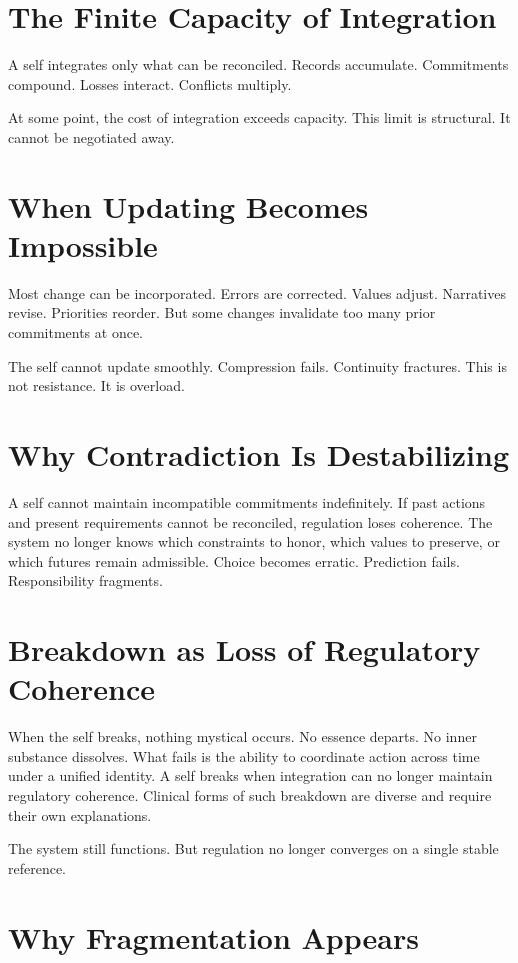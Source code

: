 \documentclass[11pt,twoside,openright]{book}
\begin{document}
\section*{The Finite Capacity of Integration}

A self integrates only what can be reconciled. Records accumulate. Commitments compound. Losses interact. Conflicts multiply.

At some point, the cost of integration exceeds capacity. This limit is structural. It cannot be negotiated away.

\section*{When Updating Becomes Impossible}

Most change can be incorporated. Errors are corrected. Values adjust. Narratives revise. Priorities reorder. But some changes invalidate too many prior commitments at once.

The self cannot update smoothly. Compression fails. Continuity fractures. This is not resistance. It is overload.

\section*{Why Contradiction Is Destabilizing}

A self cannot maintain incompatible commitments indefinitely. If past actions and present requirements cannot be reconciled, regulation loses coherence. The system no longer knows which constraints to honor, which values to preserve, or which futures remain admissible. Choice becomes erratic. Prediction fails. Responsibility fragments.

\section*{Breakdown as Loss of Regulatory Coherence}

When the self breaks, nothing mystical occurs. No essence departs. No inner substance dissolves. What fails is the ability to coordinate action across time under a unified identity. A self breaks when integration can no longer maintain regulatory coherence. Clinical forms of such breakdown are diverse and require their own explanations.

The system still functions. But regulation no longer converges on a single stable reference.

\section*{Why Fragmentation Appears}
\end{document}
